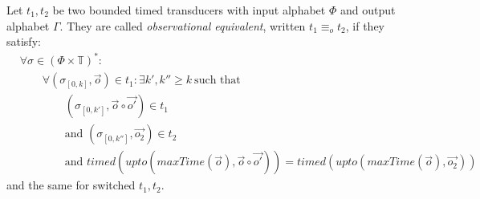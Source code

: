 \begin{definition}[name = Observational Equivalence]\label{def:observational_equivalence}
  Let \(t_1, t_2\) be two bounded timed transducers with input alphabet \(\Phi\) and output alphabet \(\Gamma\).
  They are called \emph{observational equivalent}, written \(t_1 \equiv_o t_2\), if they satisfy:
  \begin{align*}
    &\forall \sigma \in {(\Phi\times\mathbb{T})}^*:\\
    &\hspace{2em}\forall (\sigma_{[0,k]}, \vec{o}) \in t_1: \exists k', k'' \geq k\ \text{such that}\\
    &\hspace{4em}(\sigma_{[0,k']}, \vec{o} \circ \vec{o'}) \in t_1\\
    &\hspace{4em}\text{and } (\sigma_{[0,k'']}, \vec{o_2}) \in t_2\\
    &\hspace{4em}\text{and } \mathit{timed}(\mathit{upto}(\mathit{maxTime}(\vec{o}),\vec{o} \circ \vec{o'} )) = \mathit{timed}(\mathit{upto}(\mathit{maxTime}(\vec{o}),\vec{o_2}))
  \end{align*}
  and the same for switched \(t_1, t_2\).
\end{definition}

